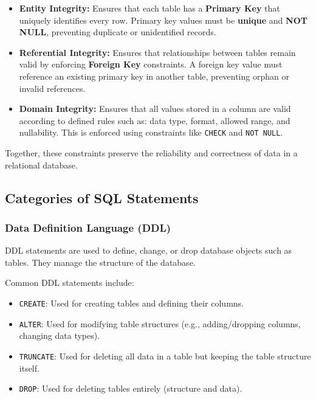 \documentclass{article}
\begin{document}
\begin{itemize}

    \item \textbf{Entity Integrity:}  
    Ensures that each table has a \textbf{Primary Key} that uniquely identifies every row.  
    Primary key values must be \textbf{unique} and \textbf{NOT NULL}, preventing duplicate or unidentified records.

    \item \textbf{Referential Integrity:}  
    Ensures that relationships between tables remain valid by enforcing \textbf{Foreign Key} constraints.  
    A foreign key value must reference an existing primary key in another table, preventing orphan or invalid references.

    \item \textbf{Domain Integrity:}  
    Ensures that all values stored in a column are valid according to defined rules such as:
    data type, format, allowed range, and nullability.  
    This is enforced using constraints like \texttt{CHECK} and \texttt{NOT NULL}.

\end{itemize}

Together, these constraints preserve the reliability and correctness of data in a relational database.

\subsection{Categories of SQL Statements}

\subsubsection{Data Definition Language (DDL)}
DDL statements are used to define, change, or drop database objects such as tables. They manage the structure of the database.

Common DDL statements include:
\begin{itemize}
    \item \texttt{CREATE}: Used for creating tables and defining their columns.
    \item \texttt{ALTER}: Used for modifying table structures (e.g., adding/dropping columns, changing data types).
    \item \texttt{TRUNCATE}: Used for deleting all data in a table but keeping the table structure itself.
    \item \texttt{DROP}: Used for deleting tables entirely (structure and data).
\end{itemize}
\end{document}
